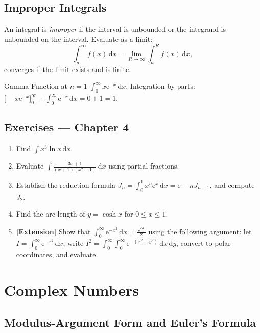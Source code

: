 \documentclass[12pt, a4paper]{book}
\newcommand{\dd}{\,\mathrm{d}}
\newcommand{\dx}{\,\mathrm{d}x}
\newcommand{\e}{\mathrm{e}}
\begin{document}
\section{Improper Integrals}

An integral is \emph{improper} if the interval is unbounded or the integrand is unbounded on the interval. Evaluate as a limit:
\[
\int_a^{\infty}f(x)\dx = \lim_{R\to\infty}\int_a^R f(x)\dx,
\]
converges if the limit exists and is finite.

\begin{example}{Gamma Function at $n=1$}{}
$\displaystyle\int_0^{\infty}x\e^{-x}\dx$. Integration by parts:
$\displaystyle \bigl[-x\e^{-x}\bigr]_0^{\infty}+\int_0^{\infty}\e^{-x}\dx = 0+1=1.$
\end{example}

\section*{Exercises --- Chapter 4}
\begin{enumerate}[label=\textbf{\arabic*.}]
  \item Find $\displaystyle\int x^3\ln x\dx$.
  \item Evaluate $\displaystyle\int\frac{3x+1}{(x+1)(x^2+1)}\dx$ using partial fractions.
  \item Establish the reduction formula $J_n = \displaystyle\int_0^1 x^n\e^x\dx = \e-nJ_{n-1}$, and compute $J_2$.
  \item Find the arc length of $y=\cosh x$ for $0\leq x\leq 1$.
  \item \textbf{[Extension]} Show that $\displaystyle\int_0^\infty\e^{-x^2}\dx=\frac{\sqrt{\pi}}{2}$ using the following argument: let $\displaystyle I=\int_0^\infty\e^{-x^2}\dx$, write $\displaystyle I^2=\int_0^\infty\int_0^\infty\e^{-(x^2+y^2)}\dx\dd y$, convert to polar coordinates, and evaluate.
\end{enumerate}

\chapter{Complex Numbers}

\section{Modulus-Argument Form and Euler's Formula}
\end{document}
